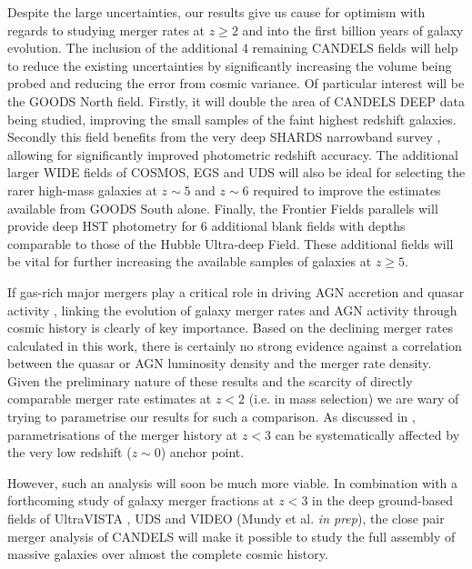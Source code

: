 Despite the large uncertainties, our results give us cause for optimism with regards to studying merger rates at $z \geq 2$ and into the first billion years of galaxy evolution. The inclusion of the additional 4 remaining CANDELS fields will help to reduce the existing uncertainties by significantly increasing the volume being probed and reducing the error from cosmic variance. Of particular interest will be the GOODS North field. Firstly, it will double the area of CANDELS DEEP data being studied, improving the small samples of the faint highest redshift galaxies. Secondly this field benefits from the very deep SHARDS narrowband survey \citep{PerezGonzalez:2012fo}, allowing for significantly improved photometric redshift accuracy. The additional larger WIDE fields of COSMOS, EGS and UDS will also be ideal for selecting the rarer high-mass galaxies at $z\sim5$ and $z\sim6$ required to improve the estimates available from GOODS South alone. Finally, the Frontier Fields parallels \citep{2015ApJ...800...84C} will provide deep HST photometry for 6 additional blank fields with depths comparable to those of the Hubble Ultra-deep Field. These additional fields will be vital for further increasing the available samples of galaxies at $z \geq 5$.

If gas-rich major mergers play a critical role in driving AGN accretion and quasar activity \citep{Springel:2005co,Hopkins:2008gr}, linking the evolution of galaxy merger rates and AGN activity through cosmic history is clearly of key importance. Based on the declining merger rates calculated in this work, there is certainly no strong evidence against a correlation between the quasar or AGN luminosity density and the merger rate density. Given the preliminary nature of these results and the scarcity of directly comparable merger rate estimates at $z < 2$ (i.e. in mass selection) we are wary of trying to parametrise our results for such a comparison. As discussed in \citet{Conselice:2014ct}, parametrisations of the merger history at $z < 3$ can be systematically affected by the very low redshift ($z\sim0$) anchor point. 

However, such an analysis will soon be much more viable. In combination with a forthcoming study of galaxy merger fractions at $z < 3$ in the deep ground-based fields of UltraVISTA \citep{McCracken:2012gd}, UDS \citep{Lawrence:2007hu} and VIDEO \citep{Jarvis:2012hr} (Mundy et al. \emph{in prep}), the close pair merger analysis of CANDELS will make it possible to study the full assembly of massive galaxies over almost the complete cosmic history.

